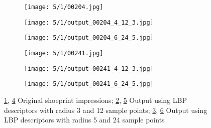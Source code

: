 \documentclass[draft,final]{vutinfth} %
\begin{document}
\begin{figure}[h]
  \centering
	\begin{subfigure}[t]{0.16\columnwidth}
    \centering
    \texttt{[image: 5/1/00204.jpg]}
    \subcaption{}
    \label{fig:pe:204:orig}
  \end{subfigure}
  \begin{subfigure}[t]{0.16\columnwidth}
    \centering
    \texttt{[image: 5/1/output\_00204\_4\_12\_3.jpg]}
    \subcaption{}
    \label{fig:pe:204:LBPs}
  \end{subfigure}
  \begin{subfigure}[t]{0.16\columnwidth}
    \centering
    \texttt{[image: 5/1/output\_00204\_6\_24\_5.jpg]}
    \subcaption{}
    \label{fig:pe:204:LBPb}
  \end{subfigure}
  \begin{subfigure}[t]{0.16\columnwidth}
    \centering
    \texttt{[image: 5/1/00241.jpg]}
    \subcaption{}
    \label{fig:pe:241:orig}
  \end{subfigure}
  \begin{subfigure}[t]{0.16\columnwidth}
    \centering
    \texttt{[image: 5/1/output\_00241\_4\_12\_3.jpg]}
    \subcaption{}
    \label{fig:pe:241:LBPs}
  \end{subfigure}
  \begin{subfigure}[t]{0.16\columnwidth}
    \centering
    \texttt{[image: 5/1/output\_00241\_6\_24\_5.jpg]}
    \subcaption{}
    \label{fig:pe:241:LBPb}
  \end{subfigure}
  \caption{\ref{fig:pe:204:orig}, \ref{fig:pe:241:orig} Original shoeprint impressions; \ref{fig:pe:204:LBPs}, \ref{fig:pe:241:LBPs} Output using LBP descriptors with radius 3 and 12 sample points; \ref{fig:pe:204:LBPb}, \ref{fig:pe:241:LBPb} Output using LBP descriptors with radius 5 and 24 sample points}
  \label{fig:pe:LPBexp}
\end{figure}
\end{document}
